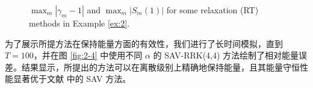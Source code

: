 	\begin{figure}[H]
	\begin{center}
	\caption{$\max _m\left|\gamma_m-1\right|$ and $\max_m\left|S_m(1)\right|$ for some relaxation (RT) methods in Example \ref{ex:2}.}
	\label{fig:2-1}
	\end{center}
	\end{figure}
	为了展示所提方法在保持能量方面的有效性，我们进行了长时间模拟，直到 $T=100$，并在图 \ref{fig:2-4} 中使用不同 $\alpha$ 的 SAV-RRK(4,4) 方法绘制了相对能量误差。结果显示，所提出的方法可以在离散级别上精确地保持能量，且其能量守恒性能显著优于文献 \cite{chengConvergenceEnergyconservingScheme2022} 中的 SAV 方法。
